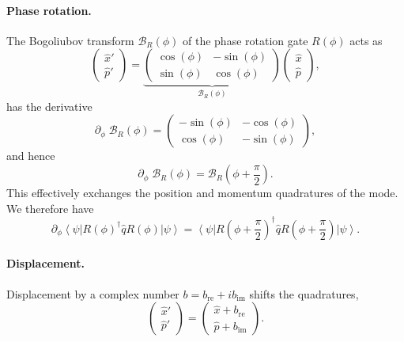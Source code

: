 \documentclass[aps,pra,10pt,twocolumn,groupedaddress,nofootinbib]{revtex4-1}
\theoremstyle{plain}
\newcommand{\ket}[1]{\ensuremath{\left| #1 \right \rangle}}
\newcommand{\bra}[1]{\ensuremath{\left \langle #1 \right |}}
\newcommand{\x}{\hat{x}}
\newcommand{\p}{\hat{p}}
\begin{document}
\paragraph{Phase rotation.}
The Bogoliubov transform $ \mathcal{B}_R(\phi)$ of the phase rotation gate $R(\phi)$ acts as
\[
\begin{pmatrix}
\x'\\
\p'
\end{pmatrix} =  \underbrace{\begin{pmatrix} \cos(\phi) & -\sin(\phi) \\
\sin(\phi) & \cos(\phi) \end{pmatrix}}_{\mathcal{B}_R(\phi)}\begin{pmatrix} \x\\ \p \end{pmatrix}, \]
has the derivative
\[ \partial_{\phi} \; \mathcal{B}_R(\phi) = \begin{pmatrix} -\sin(\phi) & -\cos(\phi) \\
\cos(\phi) & -\sin(\phi) \end{pmatrix} ,\]
and hence
\[ \partial_{\phi} \; \mathcal{B}_R(\phi) = \mathcal{B}_R(\phi + \frac{\pi}{2}).\]
This effectively exchanges the position and momentum quadratures of the mode.\\

We therefore have
\begin{equation} \label{eq:derivative_rhase_rotation}
  \partial_{\phi}\bra{\psi} R(\phi)^{\dagger} \hat{q} R(\phi) \ket{\psi} =  \bra{\psi} R(\phi + \frac{\pi}{2})^{\dagger} \hat{q} R(\phi + \frac{\pi}{2}) \ket{\psi}. 
\end{equation}

\paragraph{Displacement.}

Displacement by a complex number $b = b_{\mathrm{re}} + i b_{\mathrm{im}}$ shifts the quadratures,
\[
\begin{pmatrix}
\x'\\
\p'
\end{pmatrix} = \begin{pmatrix} \x + b_{\mathrm{re}} \\ \p + b_{\mathrm{im}} \end{pmatrix}. \]
\end{document}

